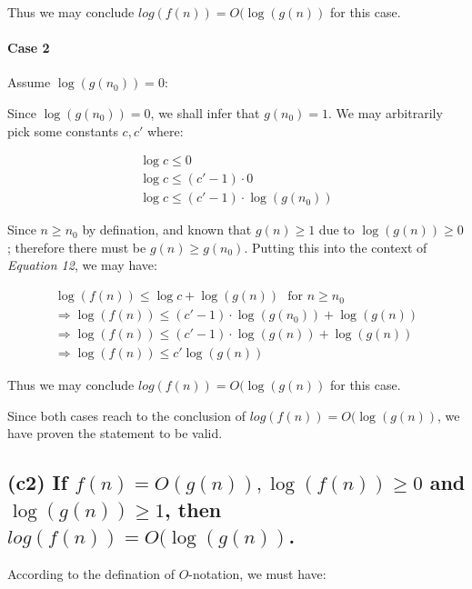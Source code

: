 \documentclass[12pt]{article}
\begin{document}
Thus we may conclude $log(f(n)) = O(\log(g(n))$ for this case.


\paragraph{Case 2} Assume $\log (g(n_{0})) = 0$:

Since $\log (g(n_{0})) = 0$, we shall infer that $g(n_{0}) = 1$. We may arbitrarily pick some constants $c, c'$ where:

\begin{gather}
    \log c \leq 0 \nonumber\\
    \log c \leq (c' - 1) \cdot 0 \nonumber\\
    \log c \leq (c' - 1) \cdot \log(g(n_{0}))
\end{gather}

Since $n \geq n_{0}$ by defination, and known that $g(n) \geq 1$ due to $\log(g(n)) \geq 0$; therefore there must be $g(n) \geq g(n_{0})$. Putting this into the context of \textit{Equation 12}, we may have:

\begin{gather}
    \log(f(n)) \leq \log c + \log(g(n)) \ \ \ \text{for $n \geq n_{0}$} \nonumber \\
    \Rightarrow \log(f(n)) \leq (c' - 1) \cdot \log(g(n_{0})) + \log(g(n)) \nonumber \\
    \Rightarrow \log(f(n)) \leq (c' - 1) \cdot \log(g(n)) + \log(g(n)) \nonumber \\
    \Rightarrow \log(f(n)) \leq c'\log(g(n))
\end{gather}

Thus we may conclude $log(f(n)) = O(\log(g(n))$ for this case.\newline

Since both cases reach to the conclusion of $log(f(n)) = O(\log(g(n))$, we have proven the statement to be valid.



\subsection{(c2) If $f(n) = O(g(n)), \log(f(n)) \geq 0$ and $\log(g(n)) \geq 1$, then $log(f(n)) = O(\log(g(n))$.}



According to the defination of $O$-notation, we must have:
\end{document}
